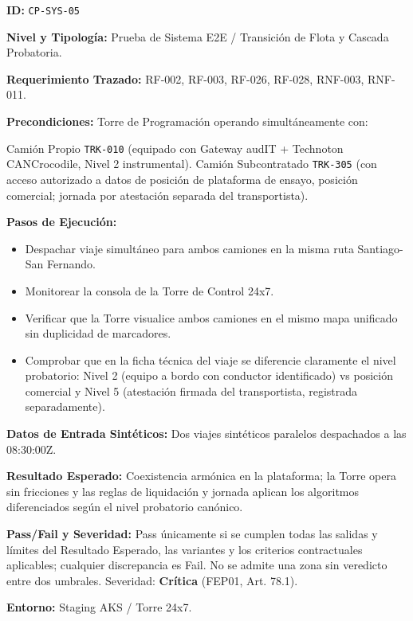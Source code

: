 \par\noindent\textbf{ID:} \texttt{CP-\allowbreak{}SYS-\allowbreak{}05}\par
\par\noindent\textbf{Nivel y Tipología:} Prueba de Sistema E2E / Transición de Flota y Cascada Probatoria.\par
\par\noindent\textbf{Requerimiento Trazado:} RF-002, RF-003, RF-026, RF-028, RNF-003, RNF-011.\par
\par\noindent\textbf{Precondiciones:} Torre de Programación operando simultáneamente con:\par
Camión Propio \texttt{TRK-\allowbreak{}010} (equipado con Gateway audIT + Technoton CANCrocodile, Nivel 2 instrumental).
Camión Subcontratado \texttt{TRK-\allowbreak{}305} (con acceso autorizado a datos de posición de plataforma de ensayo, posición comercial; jornada por atestación separada del transportista).
\par\noindent\textbf{Pasos de Ejecución:}\par
\begin{itemize}
\item Despachar viaje simultáneo para ambos camiones en la misma ruta Santiago-San Fernando.
\item Monitorear la consola de la Torre de Control 24x7.
\item Verificar que la Torre visualice ambos camiones en el mismo mapa unificado sin duplicidad de marcadores.
\item Comprobar que en la ficha técnica del viaje se diferencie claramente el nivel probatorio: Nivel 2 (equipo a bordo con conductor identificado) vs posición comercial y Nivel 5 (atestación firmada del transportista, registrada separadamente).
\end{itemize}

\par\noindent\textbf{Datos de Entrada Sintéticos:} Dos viajes sintéticos paralelos despachados a las 08:30:00Z.\par
\par\noindent\textbf{Resultado Esperado:} Coexistencia armónica en la plataforma; la Torre opera sin fricciones y las reglas de liquidación y jornada aplican los algoritmos diferenciados según el nivel probatorio canónico.\par
\par\noindent\textbf{Pass/Fail y Severidad:} Pass únicamente si se cumplen todas las salidas y límites del Resultado Esperado, las variantes y los criterios contractuales aplicables; cualquier discrepancia es Fail. No se admite una zona sin veredicto entre dos umbrales. Severidad: \textbf{Crítica} (FEP01, Art. 78.1).\par
\par\noindent\textbf{Entorno:} Staging AKS / Torre 24x7.\par

